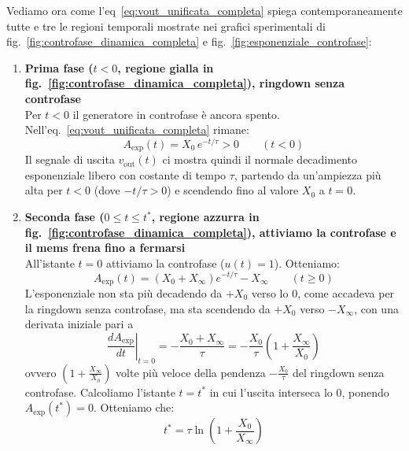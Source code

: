 \documentclass[11pt,a4paper]{article}
\begin{document}
\noindent Vediamo ora come l'eq~\eqref{eq:vout_unificata_completa} spiega contemporaneamente tutte e tre le regioni temporali mostrate nei grafici sperimentali di fig.~\ref{fig:controfase_dinamica_completa} e fig.~\ref{fig:esponenziale_controfase}:
\begin{enumerate}
    \item \textbf{Prima fase ($t < 0$, regione gialla in fig.~\ref{fig:controfase_dinamica_completa}), ringdown senza controfase} \\
    Per $t < 0$ il generatore in controfase è ancora spento. Nell'eq.~\eqref{eq:vout_unificata_completa} rimane:
    \begin{equation}
        A_{\text{exp}}(t) = X_0 \, e^{-t/\tau} > 0 \qquad (t < 0)
    \end{equation}
    Il segnale di uscita $v_{\text{out}}(t)$ ci mostra quindi il normale decadimento esponenziale libero con costante di tempo $\tau$, partendo da un'ampiezza più alta per $t < 0$ (dove $-t/\tau > 0$) e scendendo fino al valore $X_0$ a $t = 0$.

    \item \textbf{Seconda fase ($0 \le t \le t^*$, regione azzurra in fig.~\ref{fig:controfase_dinamica_completa}), attiviamo la controfase e il mems frena fino a fermarsi} \\
    All'istante $t = 0$ attiviamo la controfase ($u(t) = 1$). Otteniamo:
    \begin{equation}
        \label{eq:A_exp_t_pos}
        A_{\text{exp}}(t) = \left(X_0 + X_\infty\right) e^{-t/\tau} - X_\infty \qquad (t \ge 0)
    \end{equation}
    L'esponenziale non sta più decadendo da $+X_0$ verso lo $0$, come accadeva per la ringdown senza controfase, ma sta scendendo da $+X_0$ verso $-X_\infty$, con una derivata iniziale pari a
    \begin{equation}
        \left.\frac{d A_{\text{exp}}}{dt}\right|_{t=0} = -\frac{X_0 + X_\infty}{\tau} = -\frac{X_0}{\tau}\left(1 + \frac{X_\infty}{X_0}\right)
    \end{equation}
    ovvero $\left(1 + \frac{X_\infty}{X_0}\right)$ volte più veloce della pendenza $-\frac{X_0}{\tau}$ del ringdown senza controfase. Calcoliamo l'istante $t = t^*$ in cui l'uscita interseca lo 0, ponendo $A_{\text{exp}}(t^*) = 0$. Otteniamo che:
    \begin{equation}
        \label{eq:t_star_formula}
        t^* = \tau \ln\left(1 + \frac{X_0}{X_\infty}\right)
    \end{equation}


\end{enumerate}
\end{document}
